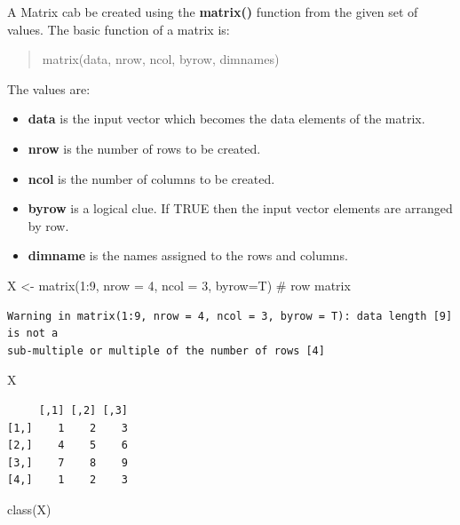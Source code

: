 \documentclass[
  letterpaper,
  DIV=11,
  numbers=noendperiod]{scrreprt}
\newenvironment{Shaded}{\begin{snugshade}}{\end{snugshade}}
\newcommand{\AttributeTok}[1]{\textcolor[rgb]{0.40,0.45,0.13}{#1}}
\newcommand{\CommentTok}[1]{\textcolor[rgb]{0.37,0.37,0.37}{#1}}
\newcommand{\DecValTok}[1]{\textcolor[rgb]{0.68,0.00,0.00}{#1}}
\newcommand{\FunctionTok}[1]{\textcolor[rgb]{0.28,0.35,0.67}{#1}}
\newcommand{\NormalTok}[1]{\textcolor[rgb]{0.00,0.23,0.31}{#1}}
\newcommand{\OtherTok}[1]{\textcolor[rgb]{0.00,0.23,0.31}{#1}}
\newcommand{\SpecialCharTok}[1]{\textcolor[rgb]{0.37,0.37,0.37}{#1}}
\begin{document}
A Matrix cab be created using the \textbf{matrix()} function from the
given set of values. The basic function of a matrix is:

\begin{quote}
matrix(data, nrow, ncol, byrow, dimnames)
\end{quote}

The values are:

\begin{itemize}
\item
  \textbf{data} is the input vector which becomes the data elements of
  the matrix.
\item
  \textbf{nrow} is the number of rows to be created.
\item
  \textbf{ncol} is the number of columns to be created.
\item
  \textbf{byrow} is a logical clue. If TRUE then the input vector
  elements are arranged by row.
\item
  \textbf{dimname} is the names assigned to the rows and columns.
\end{itemize}

\begin{Shaded}
\begin{Highlighting}[]
\NormalTok{X }\OtherTok{\textless{}{-}} \FunctionTok{matrix}\NormalTok{(}\DecValTok{1}\SpecialCharTok{:}\DecValTok{9}\NormalTok{, }\AttributeTok{nrow =} \DecValTok{4}\NormalTok{, }\AttributeTok{ncol =} \DecValTok{3}\NormalTok{, }\AttributeTok{byrow=}\NormalTok{T) }\CommentTok{\# row matrix}
\end{Highlighting}
\end{Shaded}

\begin{verbatim}
Warning in matrix(1:9, nrow = 4, ncol = 3, byrow = T): data length [9] is not a
sub-multiple or multiple of the number of rows [4]
\end{verbatim}

\begin{Shaded}
\begin{Highlighting}[]
\NormalTok{X}
\end{Highlighting}
\end{Shaded}

\begin{verbatim}
     [,1] [,2] [,3]
[1,]    1    2    3
[2,]    4    5    6
[3,]    7    8    9
[4,]    1    2    3
\end{verbatim}

\begin{Shaded}
\begin{Highlighting}[]
\FunctionTok{class}\NormalTok{(X)}
\end{Highlighting}
\end{Shaded}
\end{document}
